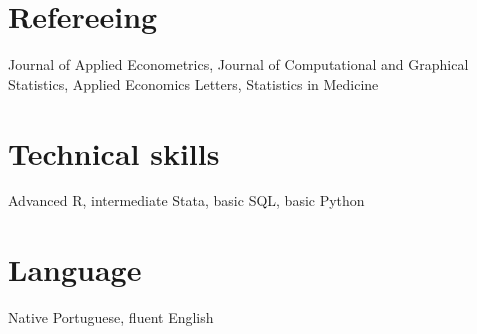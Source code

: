 \documentclass[11pt]{article}
\begin{document}
\section{Refereeing}
Journal of Applied Econometrics, Journal of Computational and Graphical Statistics, Applied Economics Letters, Statistics in Medicine

\section{Technical skills}
\label{sec:orgc51371c}
Advanced R, intermediate Stata, basic SQL, basic Python

\section{Language}
\label{sec:orgf2accdc}
Native Portuguese, fluent English
\end{document}
